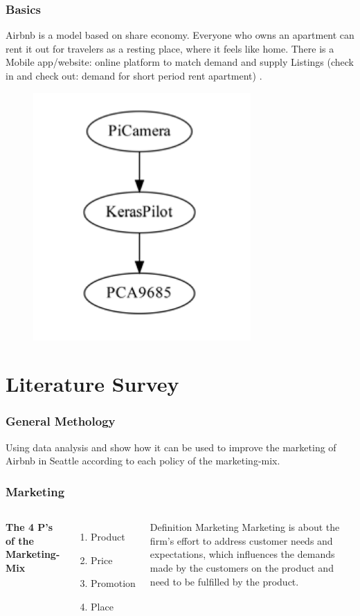 \documentclass{beamer}
\begin{document}
\begin{frame}
\frametitle{Basics}
Airbnb is a model based on share economy. Everyone who owns an apartment can rent it out for travelers as a resting place, where it feels like home. There is a Mobile app/website: online platform to match demand and supply Listings (check in and check out: demand for short period rent apartment) .
\begin{figure}
\includegraphics[width=0.5\linewidth]{photo/autonom}
\end{figure}
\end{frame}

\section{Literature Survey}
\begin{frame}
\frametitle{General Methology}
Using data analysis and show how it can be used to improve the marketing of Airbnb in Seattle according to each policy of the marketing-mix.
\end{frame}
%
%
\begin{frame}
\frametitle{Marketing}
\begin{columns}[c] %

\textbf{The 4 P's of the Marketing-Mix}
\begin{enumerate}
\item Product
\item Price
\item Promotion
\item Place
\end{enumerate}


\begin{block}{Definition Marketing}
Marketing is about the firm’s effort to address customer needs and expectations, which influences the demands made by the customers on the product and need to be fulfilled by the product.
\end{block}
\end{columns}
\end{frame}
\end{document}
